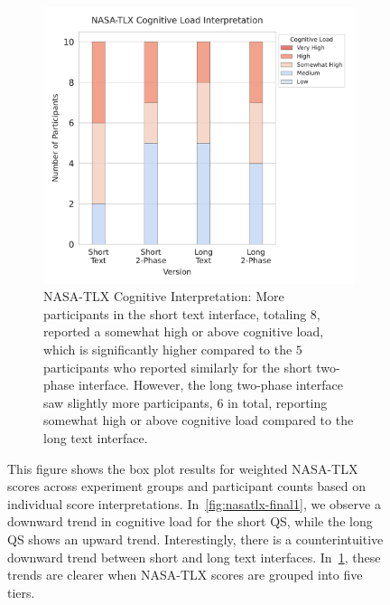 \begin{figure}[ht]
    \hfill
    \begin{subfigure}[t]{0.49\textwidth}
        \centering
        \includegraphics[width=1\textwidth]{content/image/results/nasatlx_cog_value_interpreted.pdf}
        \caption{NASA-TLX Cognitive Interpretation: More participants in the short text interface, totaling $8$, reported a somewhat high or above cognitive load, which is significantly higher compared to the $5$ participants who reported similarly for the short two-phase interface. However, the long two-phase interface saw slightly more participants, $6$ in total, reporting somewhat high or above cognitive load compared to the long text interface.}
        \label{fig:nasatlx-final2}
    \end{subfigure}
    \caption{This figure shows the box plot results for weighted NASA-TLX scores across experiment groups and participant counts based on individual score interpretations. In~\ref{fig:nasatlx-final1}, we observe a downward trend in cognitive load for the short QS, while the long QS shows an upward trend. Interestingly, there is a counterintuitive downward trend between short and long text interfaces. In~\ref{fig:nasatlx-final2}, these trends are clearer when NASA-TLX scores are grouped into five tiers.}
    \label{fig:nasatlx-final}
\end{figure}


